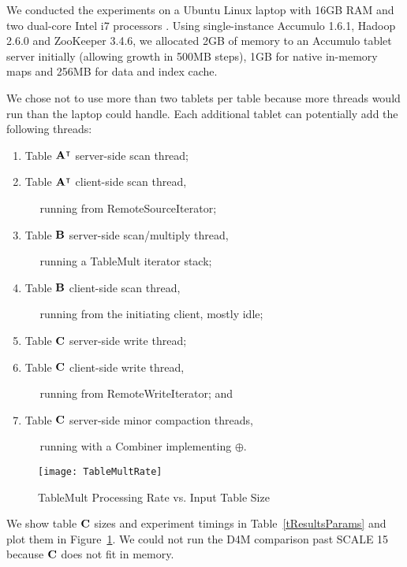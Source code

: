 We conducted the experiments on a Ubuntu Linux laptop with 16GB RAM and two dual-core Intel i7 processors%
. Using single-instance Accumulo 1.6.1, Hadoop 2.6.0 and ZooKeeper 3.4.6,
we allocated 2GB of memory to an Accumulo tablet server initially
(allowing growth in 500MB steps),
1GB for native in-memory maps and 256MB for data and index cache.


We chose not to use more than two tablets per table because more threads would run
than the laptop could handle.  Each additional tablet can potentially add the following threads:
\begin{enumerate}
\item Table $\mathbf{A}^{\intercal}$ server-side scan thread;
\item Table $\mathbf{A}^{\intercal}$ client-side scan thread,

$\quad$ running from RemoteSourceIterator;
\item Table $\mathbf{B}$ server-side scan/multiply thread,

$\quad$ running a TableMult iterator stack;
\item Table $\mathbf{B}$ client-side scan thread, 

$\quad$ running from the initiating client, mostly idle;
\item Table $\mathbf{C}$ server-side write thread;
\item Table $\mathbf{C}$ client-side write thread,

$\quad$ running from RemoteWriteIterator; and
\item Table $\mathbf{C}$ server-side minor compaction threads,

$\quad$ running with a Combiner implementing $\oplus$.
\end{enumerate}

\begin{figure}[tbh]
\centering
\texttt{[image: TableMultRate]}
\caption{TableMult Processing Rate vs. Input Table Size}
\label{fTableMultPerf}
\vspace{-4pt}
\end{figure}

We show table $\mathbf{C}$ sizes and experiment timings in Table~\ref{tResultsParams}
and plot them in Figure~\ref{fTableMultPerf}.
We could not run the D4M comparison past SCALE 15 because $\mathbf{C}$ does not fit in memory.

